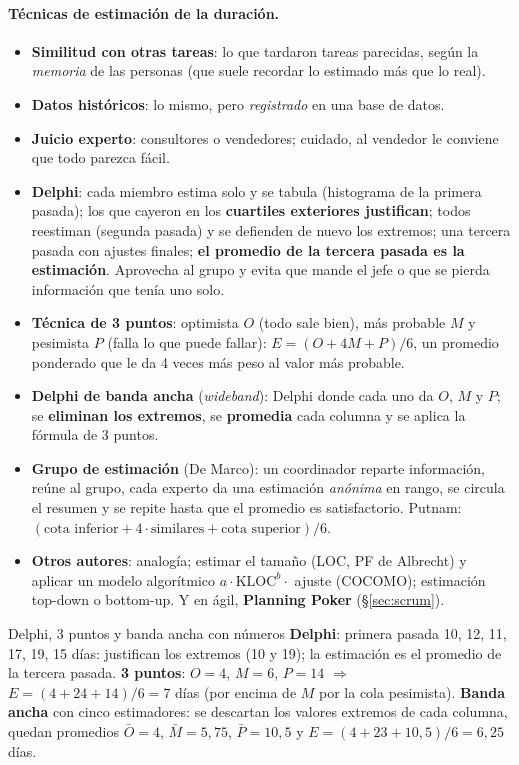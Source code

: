 \documentclass[11pt,a4paper]{article}
\begin{document}
\paragraph{Técnicas de estimación de la duración.}
\begin{itemize}
  \item \textbf{Similitud con otras tareas}: lo que tardaron tareas parecidas, según la \emph{memoria} de las
  personas (que suele recordar lo estimado más que lo real).
  \item \textbf{Datos históricos}: lo mismo, pero \emph{registrado} en una base de datos.
  \item \textbf{Juicio experto}: consultores o vendedores; cuidado, al vendedor le conviene que todo parezca fácil.
  \item \textbf{Delphi}: cada miembro estima solo y se tabula (histograma de la primera
  pasada); los que cayeron en los \textbf{cuartiles exteriores justifican}; todos reestiman (segunda pasada) y
  se defienden de nuevo los extremos; una tercera pasada con ajustes finales; \textbf{el promedio de la tercera
  pasada es la estimación}. Aprovecha al grupo y evita que mande el jefe o que se pierda información que tenía
  uno solo.
  \item \textbf{Técnica de 3 puntos}: optimista $O$ (todo sale bien), más probable $M$ y pesimista $P$ (falla lo
  que puede fallar): $E = (O + 4M + P)/6$, un promedio ponderado que le da 4 veces más peso al valor más probable.
  \item \textbf{Delphi de banda ancha} (\emph{wideband}): Delphi donde cada uno da $O$, $M$ y $P$; se
  \textbf{eliminan los extremos}, se \textbf{promedia} cada columna y se aplica la fórmula de 3 puntos.
  \item \textbf{Grupo de estimación} (De Marco): un coordinador reparte información, reúne al grupo, cada
  experto da una estimación \emph{anónima} en rango, se circula el resumen y se repite hasta que el promedio es
  satisfactorio. Putnam: $(\text{cota inferior} + 4 \cdot \text{similares} + \text{cota superior})/6$.
  \item \textbf{Otros autores}: analogía; estimar el tamaño (LOC, PF de Albrecht) y aplicar un modelo
  algorítmico $a \cdot \text{KLOC}^b \cdot$ ajuste (COCOMO); estimación top-down o bottom-up. Y en ágil,
  \textbf{Planning Poker} (§\ref{sec:scrum}).
\end{itemize}
\begin{ejemplo}{Delphi, 3 puntos y banda ancha con números}
\textbf{Delphi}: primera pasada 10, 12, 11, 17, 19, 15 días: justifican los extremos (10 y 19); la estimación es
el promedio de la tercera pasada. \textbf{3 puntos}: $O = 4$, $M = 6$, $P = 14$ $\Rightarrow$ $E = (4 + 24 +
14)/6 = 7$ días (por encima de $M$ por la cola pesimista). \textbf{Banda ancha} con cinco estimadores: se
descartan los valores extremos de cada columna, quedan promedios $\bar O = 4$, $\bar M = 5{,}75$, $\bar P =
10{,}5$ y $E = (4 + 23 + 10{,}5)/6 = 6{,}25$ días.
\end{ejemplo}
\end{document}
